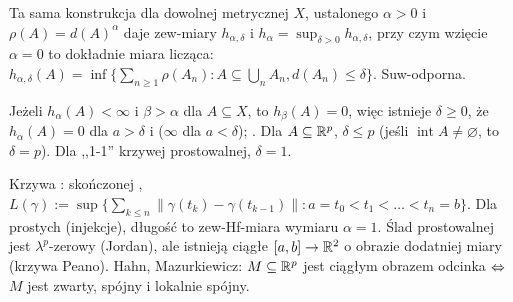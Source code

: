 Ta  sama konstrukcja dla dowolnej metrycznej $X$, ustalonego $\alpha > 0$ i $\rho(A) = d(A)^\alpha$ daje zew-miary $h_{\alpha, \delta}$ i  $h_\alpha = \sup_{\delta > 0} h_{\alpha, \delta}$, przy czym wzięcie $\alpha = 0$ to dokładnie miara licząca: $h_{\alpha, \delta} (A) = \inf \{\sum_{n \ge 1} \rho(A_n) : A \subseteq \bigcup_n A_n, d(A_n) \le \delta\}$.
Suw-odporna.

{\color{Red} Jeżeli $h_\alpha(A) < \infty$ i $\beta > \alpha$ dla $A \subseteq X$, to $h_\beta(A) = 0$, więc istnieje $\delta \ge 0$, że $h_\alpha(A) = 0$ dla $a > \delta$ i ($\infty$ dla $a < \delta$); .
Dla $A \subseteq \mathbb{R}^p$, $\delta \le p$ (jeśli $\operatorname{int} A \neq \varnothing$, to $\delta = p$).
Dla ,,1-1'' krzywej prostowalnej, $\delta = 1$.}

Krzywa  : skończonej , $L(\gamma) := \sup\{\sum_{k \le n} \|\gamma(t_k) - \gamma(t_{k-1})\| : a = t_0 < t_1 < \ldots < t_n = b\}$.
Dla prostych (injekcje), długość to zew-Hf-miara wymiaru $\alpha = 1$.
Ślad prostowalnej jest $\lambda^p$-zerowy (Jordan), ale istnieją ciągłe $[a,b] \to \mathbb{R}^2$ o obrazie dodatniej miary (krzywa Peano).
Hahn, Mazurkiewicz: $M \subseteq \mathbb{R}^p$ jest ciągłym obrazem odcinka $\Leftrightarrow$ $M$ jest zwarty, spójny i lokalnie spójny.